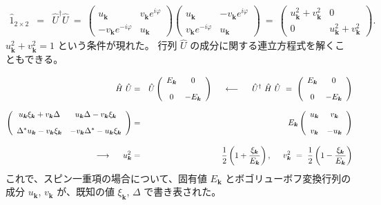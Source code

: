 \documentclass[uplatex,a4j,12pt,dvipdfmx]{jsarticle}
\begin{document}
\begin{eqnarray}
	\hat{1}_{2 \times 2}
	&=&
	\hat{U}^{\dagger}
	\hat{U}
	\ = \
	\left(
	\begin{array}{cc}
			u_{\bm{k}}                   & v_{\bm{k}} e^{i \varphi}
			\\[3mm]
			- v_{\bm{k}} e^{- i \varphi} & u_{\bm{k}}
		\end{array}
	\right)
	\!\!\!
	\left(
	\begin{array}{cc}
			u_{\bm{k}}                 & - v_{\bm{k}} e^{i \varphi}
			\\[3mm]
			v_{\bm{k}} e^{- i \varphi} & u_{\bm{k}}
		\end{array}
	\right)
	\ = \
	\left(
	\begin{array}{cc}
			u_{\bm{k}}^{2} + v_{\bm{k}}^{2} & 0
			\\[3mm]
			0                                 & u_{\bm{k}}^{2} + v_{\bm{k}}^{2}
		\end{array}
	\right)
	.
\end{eqnarray}
%
$u_{\bm{k}}^{2} + v_{\bm{k}}^{2} = 1$ という条件が現れた。
行列 $\hat{U}$ の成分に関する連立方程式を解くこともできる。

\begin{eqnarray}
	\hat{H}
	\
	\hat{U}
	&=&
	\hat{U}
	\left(
	\begin{array}{cc}
			E_{\bm{k}} & 0
			\\[3mm]
			0           & - E_{\bm{k}}
		\end{array}
	\right)
	\hspace{5mm}
	\longleftarrow
	\hspace{5mm}
	\hat{U}^{\dagger}
	\
	\hat{H}
	\
	\hat{U}
	\ = \
	\left(
	\begin{array}{cc}
			E_{\bm{k}} & 0
			\\[3mm]
			0           & - E_{\bm{k}}
		\end{array}
	\right)
	\\[2mm]
	\left(
	\begin{array}{cc}
			u_{\bm{k}} \xi_{\bm{k}} + v_{\bm{k}} \Delta     & u_{\bm{k}} \Delta - v_{\bm{k}} \xi_{\bm{k}}
			\\[3mm]
			\Delta^{*} u_{\bm{k}} - v_{\bm{k}} \xi_{\bm{k}} & - v_{\bm{k}} \Delta^{*} - u_{\bm{k}} \xi_{\bm{k}}
		\end{array}
	\right)
	&=&
	E_{\bm{k}}
	\left(
	\begin{array}{cc}
			u_{\bm{k}} & v_{\bm{k}}
			\\[3mm]
			v_{\bm{k}} & - u_{\bm{k}}
		\end{array}
	\right)
	\\[3mm]
	\longrightarrow
	\hspace{5mm}
	u_{\bm{k}}^{2}
	&=&
	\dfrac{1}{2} \left( 1 + \dfrac{\xi_{\bm{k}}}{E_{\bm{k}}} \right)
	, \hspace{5mm}
	v_{\bm{k}}^{2}
	\ = \
	\dfrac{1}{2} \left( 1 - \dfrac{\xi_{\bm{k}}}{E_{\bm{k}}} \right)
\end{eqnarray}
%
これで、スピン一重項の場合について、固有値 $E_{\bm{k}}$ とボゴリューボフ変換行列の成分 $u_{\bm{k}}$, $v_{\bm{k}}$ が、既知の値 $\xi_{\bm{k}}$, $\Delta$ で書き表された。
\end{document}
